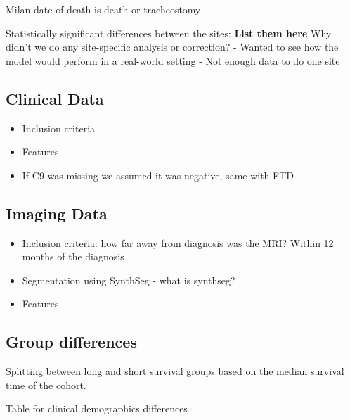 Milan date of death is death or tracheostomy

Statistically significant differences between the sites: \textbf{List them here}
Why didn't we do any site-specific analysis or correction?
- Wanted to see how the model would perform in a real-world setting
- Not enough data to do one site

\subsection{Clinical Data}
\begin{itemize}
    \item Inclusion criteria
    \item Features
    \item If C9 was missing we assumed it was negative, same with FTD
\end{itemize}

\subsection{Imaging Data}
\begin{itemize}
    \item Inclusion criteria: how far away from diagnosis was the MRI? Within 12 months of the diagnosis
    \item Segmentation using SynthSeg - what is synthseg?
    \item Features
\end{itemize}

\subsection{Group differences}

Splitting between long and short survival groups based on the median survival time of the cohort.

Table for clinical demographics differences

